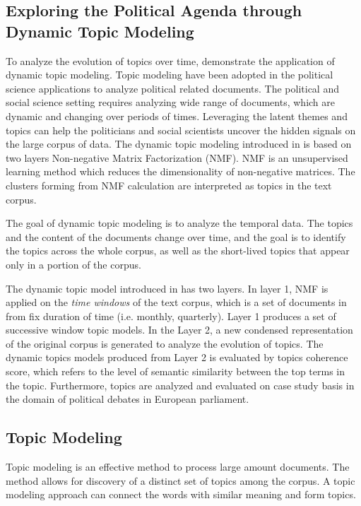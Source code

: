\subsection{Exploring the Political Agenda through Dynamic Topic Modeling}
To analyze the evolution of topics over time, \citet{Greene2016} demonstrate the application of dynamic topic modeling. Topic modeling have been adopted in the political science applications to analyze political related documents. The political and social science setting requires analyzing wide range of documents, which are dynamic and changing over periods of times. Leveraging the latent themes and topics can help the politicians and social scientists uncover the hidden signals on the large corpus of data. The dynamic topic modeling introduced in \cite{Greene2016} is based on two layers Non-negative Matrix Factorization (NMF). NMF is an unsupervised learning method which reduces the dimensionality of non-negative matrices. The clusters forming from NMF calculation are interpreted as topics in the text corpus. 

The goal of dynamic topic modeling is to analyze the temporal data. The topics and the content of the documents change over time, and the goal is to identify the topics across the whole corpus, as well as the short-lived topics that appear only in a portion of the corpus. 

The dynamic topic model introduced in \cite{Greene2016} has two layers. In layer 1,  NMF is applied on the \textit{time windows} of the text corpus, which is a set of documents in from fix duration of time (i.e. monthly, quarterly).  Layer 1 produces a set of successive window topic models. In the Layer 2, a new condensed representation of the original corpus is generated to analyze the evolution of topics. The dynamic topics models produced from Layer 2 is evaluated by topics coherence score, which refers to the level of semantic similarity between the top terms in the topic. Furthermore, topics are analyzed and evaluated on case study basis in the domain of political debates in European parliament. 





\subsection{Topic Modeling}
Topic modeling is an effective method to process large amount documents. The method allows for discovery of a distinct set of topics among the corpus. A topic modeling approach can connect the words with similar meaning and form topics. 

